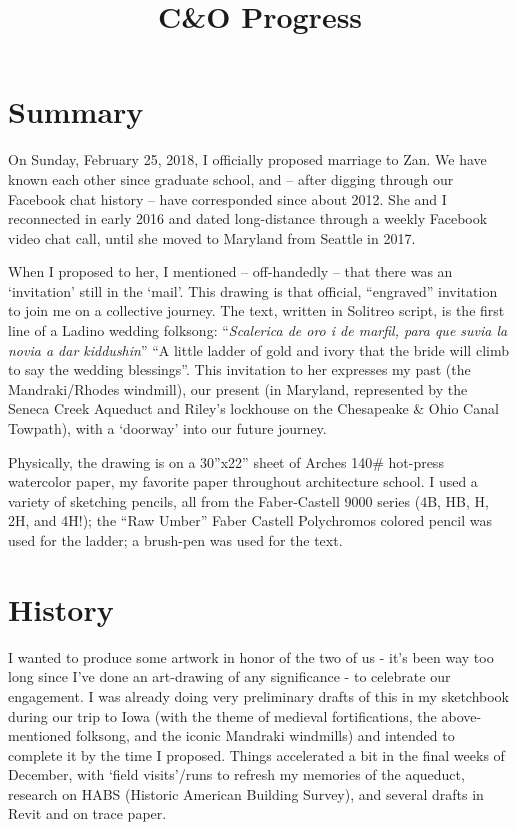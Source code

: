 ﻿\documentclass[letterpaper, 12pt, landscape]{ProgressBook}
\title{C\&O Progress}
\begin{document}
\fancyhead{} %


\section*{Summary}

On Sunday, February 25, 2018, I officially
proposed marriage to Zan. We have known each other since graduate school, and –
after digging through our Facebook chat history – have corresponded since about
2012. She and I reconnected in early 2016 and dated long-distance through a
weekly Facebook video chat call, until she moved to Maryland from Seattle in
2017.

When I proposed to her, I mentioned – off-handedly – that there
was an `invitation' still in the ‘mail’. This drawing is that official,
``engraved'' invitation to join me on a collective journey. The text, written in
Solitreo script, is the first line of a Ladino wedding folksong: ``\textit{Scalerica de oro i de marfil, para que suvia la novia a dar kiddushin}'' ``A little ladder of gold and ivory that the bride will climb to say the wedding
blessings''. This invitation to her expresses my past (the Mandraki/Rhodes
windmill), our present (in Maryland, represented by the Seneca Creek Aqueduct
and Riley’s lockhouse on the Chesapeake \& Ohio Canal Towpath), with a
‘doorway’ into our future journey.

Physically, the drawing is on a 30''x22'' sheet of Arches
140\# hot-press watercolor paper, my favorite paper throughout architecture
school. I used a variety of sketching pencils, all from the Faber-Castell 9000 series
(4B, HB, H, 2H, and 4H!); the ``Raw Umber'' Faber Castell Polychromos colored
pencil was used for the ladder; a brush-pen was used for the text.

\section*{History}

I wanted to produce some artwork in honor of the two of us - it's
been way too long since I've done an art-drawing of any significance - to
celebrate our engagement. I was already doing very preliminary drafts of this
in my sketchbook during our trip to Iowa (with the theme of medieval fortifications,
the above-mentioned folksong, and the iconic Mandraki windmills) and intended
to complete it by the time I proposed. Things accelerated a bit in the final
weeks of December, with `field visits'/runs to refresh my memories of the
aqueduct, research on HABS (Historic American Building Survey), and several
drafts in Revit and on trace paper.
\end{document}
